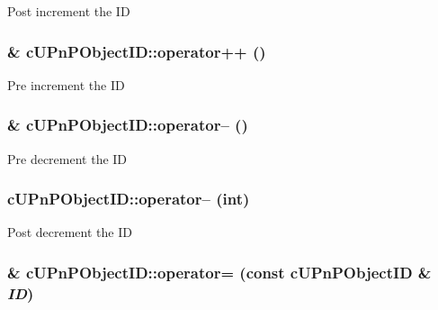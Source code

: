 Post increment the ID \hypertarget{structcUPnPObjectID_c347bd50efed28fda02f98da46114786}{
\subsubsection[{operator++}]{\& cUPnPObjectID::operator++ ()}}
\label{structcUPnPObjectID_c347bd50efed28fda02f98da46114786}


Pre increment the ID \hypertarget{structcUPnPObjectID_40864616e14e4b5c98ff274098402be7}{
\subsubsection[{operator--}]{\& cUPnPObjectID::operator-- ()}}
\label{structcUPnPObjectID_40864616e14e4b5c98ff274098402be7}


Pre decrement the ID \hypertarget{structcUPnPObjectID_3e6872234bfd011a720b7847190dfdb9}{
\subsubsection[{operator--}]{ cUPnPObjectID::operator-- (int)}}
\label{structcUPnPObjectID_3e6872234bfd011a720b7847190dfdb9}


Post decrement the ID \hypertarget{structcUPnPObjectID_9d2adc7bcee2e5b1d51aa7ffc385296f}{
\subsubsection[{operator=}]{\& cUPnPObjectID::operator= (const {\bf cUPnPObjectID} \& {\em ID})}}
\label{structcUPnPObjectID_9d2adc7bcee2e5b1d51aa7ffc385296f}


